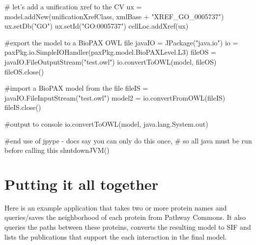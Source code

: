 \documentclass{tufte-book}
\begin{document}
\begin{fullwidth}
\begin{pythoncode}
# let's add a unification xref to the CV
ux = model.addNew(unificationXrefClass, xmlBase + "XREF_GO_0005737")
ux.setDb("GO")
ux.setId("GO:0005737")
cellLoc.addXref(ux)

#export the model to a BioPAX OWL file
javaIO = JPackage("java.io")
io = paxPkg.io.SimpleIOHandler(paxPkg.model.BioPAXLevel.L3)
fileOS = javaIO.FileOutputStream("test.owl")
io.convertToOWL(model, fileOS)
fileOS.close()

#import a BioPAX model from the file
fileIS = javaIO.FileInputStream("test.owl")
model2 = io.convertFromOWL(fileIS)
fileIS.close()

#output to console
io.convertToOWL(model, java.lang.System.out)

#end use of jpype - docs say you can only do this once,
# so all java must be run before calling this
shutdownJVM() 
\end{pythoncode}
\end{fullwidth}

\chapter{Putting it all together}

Here is an example application that takes two or more protein names and queries/saves the neighborhood of each protein from Pathway Commons. It also queries the paths between these proteins, converts the resulting model to SIF and lists the publications that support the each interaction in the final model. 
\end{document}
